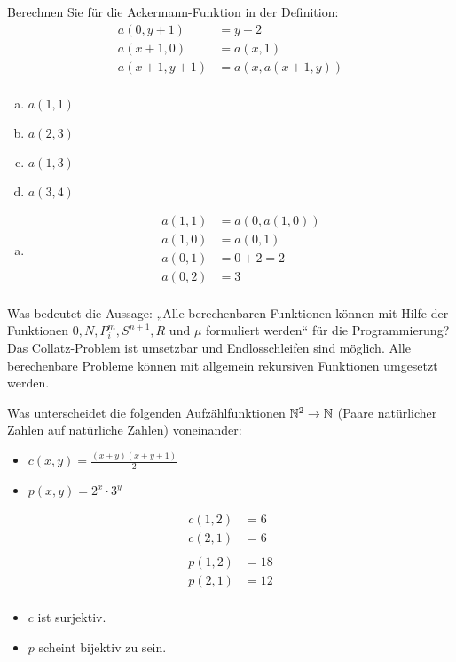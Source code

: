 \begin{card}
  Berechnen Sie für die Ackermann-Funktion in der Definition:
  \begin{align*}
    a(0, y+1) &= y+2 \\
    a(x+1, 0) &= a(x, 1) \\
    a(x+1, y+1) &= a(x, a(x+1, y)) \\
  \end{align*}
  \begin{enumerate}[a)]
    \item $a(1,1)$
    \item $a(2,3)$
    \item $a(1,3)$
    \item $a(3,4)$
  \end{enumerate}
  \hr
  \begin{enumerate}[a)]
    \item
      \begin{align*}
        a(1,1) &= a(0, a(1,0)) \\
        a(1,0) &= a(0,1) \\
        a(0,1) &= 0+2 = 2 \\
        a(0,2) &= 3 \\
      \end{align*}
  \end{enumerate}
\end{card}

\begin{card}
  Was bedeutet die Aussage: „Alle berechenbaren Funktionen können mit Hilfe der Funktionen $0, N, P^m_i, S^{n+1}, R$ und $\mu$ formuliert werden“ für die Programmierung?
  \hr
  Das Collatz-Problem ist umsetzbar und Endlosschleifen sind möglich. Alle berechenbare Probleme können mit allgemein rekursiven Funktionen umgesetzt werden.
\end{card}

\begin{card}
  Was unterscheidet die folgenden Aufzählfunktionen $\mathbb{N}^2 \rightarrow \mathbb{N}$ (Paare natürlicher Zahlen auf natürliche Zahlen) voneinander:
  \begin{itemize}
    \item $c(x, y) = \frac{(x + y)(x + y + 1)}{2}$
    \item $p(x, y) = 2^x \cdot 3^y$
  \end{itemize}
  \hr
  \begin{align*}
    c(1,2) &= 6 \\
    c(2,1) &= 6 \\
    \\
    p(1,2) &= 18 \\
    p(2,1) &= 12 \\
  \end{align*}

  \begin{itemize}
    \item $c$ ist surjektiv.
    \item $p$ scheint bijektiv zu sein.
  \end{itemize}
\end{card}

